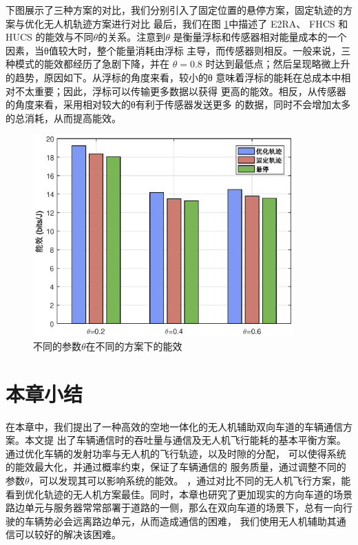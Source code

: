 下图展示了三种方案的对比，我们分别引入了固定位置的悬停方案，固定轨迹的方案与优化无人机轨迹方案进行对比
最后，我们在图 \ref{不同的参数在不同的方案下的能效}中描述了 E2RA、 FHCS 和 HUCS 的能效与不同$\theta$的关系。注意到$\theta$
是衡量浮标和传感器相对能量成本的一个因素，当θ值较大时，整个能量消耗由浮标
主导，而传感器则相反。一般来说，三种模式的能效都经历了急剧下降，并在 $\theta=0.8$
时达到最低点；然后呈现略微上升的趋势，原因如下。从浮标的角度来看，较小的θ
意味着浮标的能耗在总成本中相对不太重要；因此，浮标可以传输更多数据以获得
更高的能效。相反，从传感器的角度来看，采用相对较大的θ有利于传感器发送更多
的数据，同时不会增加太多的总消耗，从而提高能效。
\begin{figure}[H]
\centering
\includegraphics[width=10cm]{figures//chap4//不同的参数在不同的方案下的能效.eps}
\caption{不同的参数$\theta$在不同的方案下的能效}
\label{不同的参数在不同的方案下的能效}
\end{figure}
\section{本章小结}\label{section4-6}

在本章中，我们提出了一种高效的空地一体化的无人机辅助双向车道的车辆通信方案。本文提
出了车辆通信时的吞吐量与通信及无人机飞行能耗的基本平衡方案。通过优化车辆的发射功率与无人机的飞行轨迹，以及时隙的分配，
可以使得系统的能效最大化，并通过概率约束，保证了车辆通信的 服务质量，通过调整不同的参数$\theta$，可以发现其可以影响系统的能效。
，通过对比不同的无人机飞行方案，能看到优化轨迹的无人机方案最佳。同时，本章也研究了更加现实的方向车道的场景
路边单元与服务器常常部署于道路的一侧，那么在双向车道的场景下，总有一向行驶的车辆势必会远离路边单元，从而造成通信的困难，
我们使用无人机辅助其通信可以较好的解决该困难。

